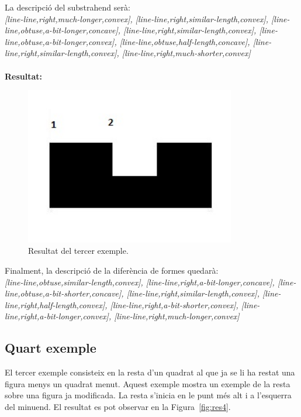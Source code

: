 \documentclass{article}
\begin{document}
La descripció del substrahend serà:
\\
\emph {[line-line,right,much-longer,convex], [line-line,right,similar-length,convex], [line-line,obtuse,a-bit-longer,concave], [line-line,right,similar-length,convex], [line-line,obtuse,a-bit-longer,convex], [line-line,obtuse,half-length,concave], [line-line,right,similar-length,convex], [line-line,right,much-shorter,convex]}
\\
\\
{\bf Resultat:}
\begin{figure}[!h]
\centering
\includegraphics[width=260pt]{images/res3.jpg}
\caption {Resultat del tercer exemple.}
\label {fig:res3}
\end{figure}

Finalment, la descripció de la diferència de formes quedarà:
\\
\emph {[line-line,obtuse,similar-length,convex], [line-line,right,a-bit-longer,concave], [line-line,obtuse,a-bit-shorter,concave], [line-line,right,similar-length,convex], [line-line,right,half-length,convex], [line-line,right,a-bit-shorter,convex], [line-line,right,a-bit-longer,convex], [line-line,right,much-longer,convex]}

\subsection{Quart exemple}
El tercer exemple consisteix en la resta d'un quadrat al que ja se li ha restat una figura menys un quadrat menut.
Aquest exemple mostra un exemple de la resta sobre una figura ja modificada.
La resta s'inicia en le punt més alt i a l'esquerra del minuend.
El resultat es pot observar en la Figura~\ref{fig:res4}.
\\
\\
\end{document}
